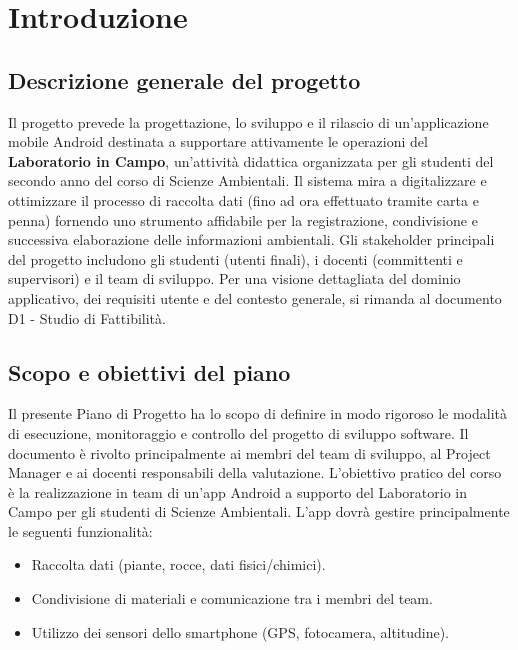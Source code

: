 \section{Introduzione}

\subsection{Descrizione generale del progetto}
Il progetto prevede la progettazione, lo sviluppo e il rilascio di un'applicazione mobile Android destinata a supportare attivamente le operazioni del \textbf{Laboratorio in Campo}, un'attività didattica organizzata per gli studenti del secondo anno del corso di Scienze Ambientali. Il sistema mira a digitalizzare e ottimizzare il processo di raccolta dati (fino ad ora effettuato tramite carta e penna) fornendo uno strumento affidabile per la registrazione, condivisione e successiva elaborazione delle informazioni ambientali. Gli stakeholder principali del progetto includono gli studenti (utenti finali), i docenti (committenti e supervisori) e il team di sviluppo. Per una visione dettagliata del dominio applicativo, dei requisiti utente e del contesto generale, si rimanda al documento D1 - Studio di Fattibilità.
\subsection{Scopo e obiettivi del piano}
Il presente Piano di Progetto ha lo scopo di definire in modo rigoroso le modalità di esecuzione, monitoraggio e controllo del progetto di sviluppo software. Il documento è rivolto principalmente ai membri del team di sviluppo, al Project Manager e ai docenti responsabili della valutazione. 
L'obiettivo pratico del corso è la realizzazione in team di un'app Android a supporto del Laboratorio in Campo per gli studenti di Scienze Ambientali. 
L'app dovrà gestire principalmente le seguenti funzionalità:
\begin{itemize}
    \item Raccolta dati (piante, rocce, dati fisici/chimici).
    \item Condivisione di materiali e comunicazione tra i membri del team.
    \item Utilizzo dei sensori dello smartphone (GPS, fotocamera, altitudine).
\end{itemize}


